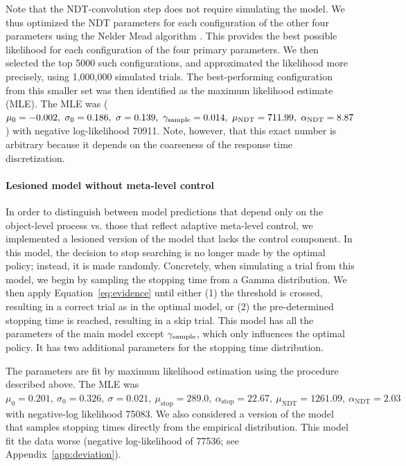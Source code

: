 Note that the NDT-convolution step does not require simulating the model. We thus optimized the NDT parameters for each configuration of the other four parameters using the Nelder Mead algorithm \citep{nelder1965simplex}. This provides the best possible likelihood for each configuration of the four primary parameters. We then selected the top 5000 such configurations, and approximated the likelihood more precisely, using 1,000,000 simulated trials. The best-performing configuration from this smaller set was then identified as the maximum likelihood estimate (MLE). The MLE was (\(
            \mu_0 = -0.002,\ 
            \sigma_0 = 0.186,\ 
            \sigma = 0.139,\ 
            \samplecost = 0.014,\ 
            \mu_\text{NDT} = 711.99,\ 
            \alpha_\text{NDT} = 8.87
        \)) with negative log-likelihood 70911. Note, however, that this exact number is arbitrary because it depends on the coarseness of the response time discretization.

\paragraph{Lesioned model without meta-level control}

In order to distinguish between model predictions that depend only on the object-level process vs. those that reflect adaptive meta-level control, we implemented a lesioned version of the model that lacks the control component. In this model, the decision to stop searching is no longer made by the optimal policy; instead, it is made randomly. Concretely, when simulating a trial from this model, we begin by sampling the stopping time from a Gamma distribution. We then apply Equation~\ref{eq:evidence} until either (1) the threshold is crossed, resulting in a correct trial as in the optimal model, or (2) the pre-determined stopping time is reached, resulting in a skip trial. This model has all the parameters of the main model except $\gamma_\text{sample}$, which only influences the optimal policy. It has two additional parameters for the stopping time distribution.


The parameters are fit by maximum likelihood estimation using the procedure described above. The MLE was \(
            \mu_0 = 0.201,\ 
            \sigma_0 = 0.326,\ 
            \sigma = 0.021,\ 
            \mu_\text{stop} = 289.0,\ 
            \alpha_\text{stop} = 22.67,\ 
            \mu_\text{NDT} = 1261.09,\ 
            \alpha_\text{NDT} = 2.03
        \) with negative-log likelihood 75083. We also considered a version of the model that samples stopping times directly from the empirical distribution. This model fit the data worse (negative log-likelihood of 77536; see Appendix~\ref{app:deviation}).

